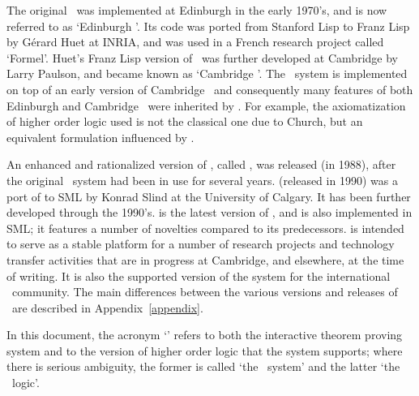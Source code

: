The original \LCF\ was implemented at Edinburgh in the early 1970's, and is now
referred to as `Edinburgh \LCF'. Its code was ported from Stanford Lisp to
Franz Lisp by G\'erard Huet at {\small INRIA}, and was used in a French
research project called `Formel'.  Huet's Franz Lisp version of \LCF\ was
further developed at Cambridge by Larry Paulson, and became known as `Cambridge
\LCF'. The \HOL\ system is implemented on top of an early version of Cambridge
\LCF\ and consequently many features of both Edinburgh and Cambridge \LCF\ were
inherited by \HOL. For example, the axiomatization of higher order logic used
is not the classical one due to Church, but an equivalent formulation
influenced by \LCF.

An enhanced and rationalized version of \HOL, called , was
released (in 1988), after the original \HOL\ system had been in use for
several years.   (released in 1990) was a port of  to SML
\cite{sml} by Konrad Slind at the University of Calgary. It has been
further developed through the 1990's.  is the latest version of
\HOL, and is also implemented in SML; it features a number of novelties
compared to its predecessors.   is intended to serve as a stable
platform for a number of research projects and technology transfer
activities that are in progress at Cambridge, and elsewhere, at the time
of writing.  It is also the supported version of the system for the
international \HOL\ community.  The main differences between the various
versions and releases of \HOL\ are described in Appendix~\ref{appendix}.

In this document, the acronym `\HOL' refers to both the interactive theorem
proving system and to the version of higher order logic that the system
supports; where there is serious ambiguity, the former is called `the \HOL\
system' and the latter `the \HOL\ logic'.


